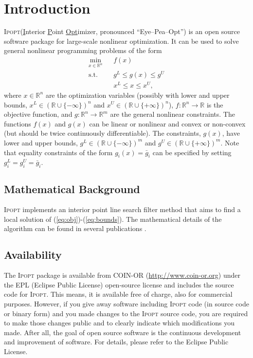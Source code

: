 \documentclass[10pt]{article}
\newcommand{\RR}{\mathbb{R}}
\newcommand{\Ipopt}{\textsc{Ipopt}\xspace}
\begin{document}
\section{Introduction}
\Ipopt (\underline{I}nterior \underline{P}oint \underline{Opt}imizer,
pronounced ``Eye--Pea--Opt'') is an open source software package for
large-scale nonlinear optimization. It can be used to solve general
nonlinear programming problems of the form
\begin{eqnarray}
\min_{x\in\RR^n} &&f(x) \label{eq:obj} \\
\mbox{s.t.} \;  &&g^L \leq g(x) \leq g^U \label{eq:constraints}\\
                &&x^L \leq x \leq x^U, \label{eq:bounds}
\end{eqnarray}
where $x \in \RR^n$ are the optimization variables (possibly with
lower and upper bounds, $x^L\in(\RR\cup\{-\infty\})^n$ and
$x^U\in(\RR\cup\{+\infty\})^n$), $f:\RR^n\longrightarrow\RR$ is the
objective function, and $g:\RR^n\longrightarrow \RR^m$ are the general
nonlinear constraints.  The functions $f(x)$ and $g(x)$ can be linear
or nonlinear and convex or non-convex (but should be twice
continuously differentiable). The constraints, $g(x)$, have lower and
upper bounds, $g^L\in(\RR\cup\{-\infty\})^m$ and
$g^U\in(\RR\cup\{+\infty\})^m$. Note that equality constraints of the
form $g_i(x)=\bar g_i$ can be specified by setting
$g^L_{i}=g^U_{i}=\bar g_i$.

\subsection{Mathematical Background}
\Ipopt implements an interior point line search filter method that
aims to find a local solution of (\ref{eq:obj})-(\ref{eq:bounds}).  The
mathematical details of the algorithm can be found in several
publications
\cite{NocWaeWal:adaptive,WaechterPhD,WaecBieg06:mp,WaeBie05:filterglobal,WaeBie05:filterlocal}.

\subsection{Availability}
The \Ipopt package is available from COIN-OR
(\url{http://www.coin-or.org}) under the EPL (Eclipse Public License)
open-source license and includes the source code for \Ipopt.  This
means, it is available free of charge, also for commercial purposes.
However, if you give away software including \Ipopt code (in source
code or binary form) and you made changes to the \Ipopt source code,
you are required to make those changes public and to clearly indicate
which modifications you made.  After all, the goal of open source
software is the continuous development and improvement of software.
For details, please refer to the Eclipse Public License.
\end{document}
